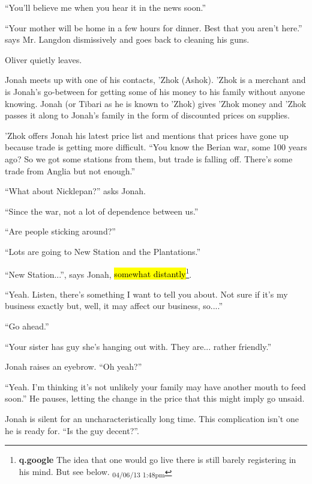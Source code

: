 ``You'll believe me when you hear it in the news soon.''

``Your mother will be home in a few hours for dinner.  Best that you aren't here.'' says Mr. Langdon dismissively and goes back to cleaning his guns.

Oliver quietly leaves.





Jonah meets up with one of his contacts, 'Zhok (Ashok).   'Zhok is a merchant and is Jonah's go-between for getting some of his money to his family without anyone knowing.  Jonah (or Tibari as he is known to 'Zhok) gives 'Zhok money and 'Zhok passes it along to Jonah's family in the form of discounted prices on supplies.



'Zhok offers Jonah his latest price list and mentions that prices have gone up because trade is getting more difficult.  ``You know the Berian war, some 100 years ago?  So we got some stations from them, but trade is falling off.  There's some trade from Anglia but not enough.''

``What about Nicklepan?'' asks Jonah.

``Since the war, not a lot of dependence between us.''

``Are people sticking around?''

``Lots are going to New Station and the Plantations.''

``New Station...'', says Jonah, \hl{somewhat distantly}\footnote{\textbf{q.google }The idea that one would go live there is still barely registering in his mind.  But see below. \textsubscript{04/06/13 1:48pm}}.

``Yeah.  Listen, there's something I want to tell you about.  Not sure if it's my business exactly but, well, it may affect our business, so....''

``Go ahead.''

``Your sister has guy she's hanging out with.  They are... rather friendly.''

Jonah raises an eyebrow.  ``Oh yeah?''

``Yeah.  I'm thinking it's not unlikely your family may have another mouth to feed soon.''  He pauses, letting the change in the price that this might imply go unsaid.

Jonah is silent for an uncharacteristically long time.  This complication isn't one he is ready for.  ``Is the guy decent?''.

